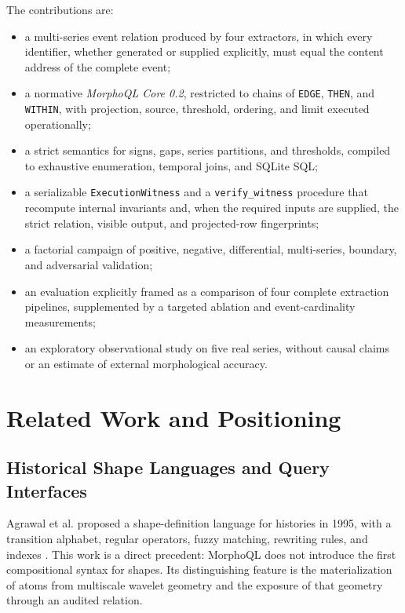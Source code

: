 \documentclass[11pt,a4paper]{article}
\newcommand{\code}[1]{\texttt{#1}}
\begin{document}
The contributions are:
\begin{itemize}
  \item a multi-series event relation produced by four extractors, in which every identifier, whether generated or supplied explicitly, must equal the content address of the complete event;
  \item a normative \emph{MorphoQL Core 0.2}, restricted to chains of \code{EDGE}, \code{THEN}, and \code{WITHIN}, with projection, source, threshold, ordering, and limit executed operationally;
  \item a strict semantics for signs, gaps, series partitions, and thresholds, compiled to exhaustive enumeration, temporal joins, and SQLite SQL;
  \item a serializable \code{ExecutionWitness} and a \code{verify\_witness} procedure that recompute internal invariants and, when the required inputs are supplied, the strict relation, visible output, and projected-row fingerprints;
  \item a factorial campaign of positive, negative, differential, multi-series, boundary, and adversarial validation;
  \item an evaluation explicitly framed as a comparison of four complete extraction pipelines, supplemented by a targeted ablation and event-cardinality measurements;
  \item an exploratory observational study on five real series, without causal claims or an estimate of external morphological accuracy.
\end{itemize}

\section{Related Work and Positioning}

\subsection{Historical Shape Languages and Query Interfaces}

Agrawal et al. proposed a shape-definition language for histories in 1995, with a transition alphabet, regular operators, fuzzy matching, rewriting rules, and indexes \cite{agrawal1995}. This work is a direct precedent: MorphoQL does not introduce the first compositional syntax for shapes. Its distinguishing feature is the materialization of atoms from multiscale wavelet geometry and the exposure of that geometry through an audited relation.
\end{document}
